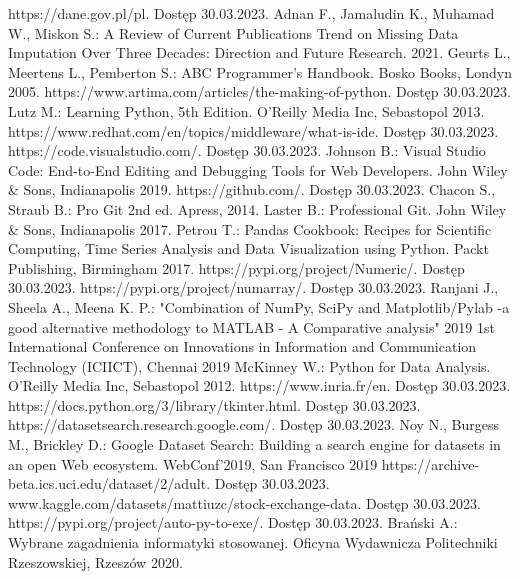 \documentclass[12pt,twoside]{article}
\begin{document}
\begin{thebibliography}{4}
     https://dane.gov.pl/pl. Dostęp 30.03.2023.
     Adnan F., Jamaludin K., Muhamad W., Miskon S.: A Review of Current Publications Trend on Missing Data Imputation Over Three Decades: Direction and Future Research. 2021.
     Geurts L., Meertens L., Pemberton S.: ABC Programmer's Handbook. Bosko Books, Londyn 2005.
     https://www.artima.com/articles/the-making-of-python. Dostęp 30.03.2023.
     Lutz M.: Learning Python, 5th Edition. O'Reilly Media Inc, Sebastopol 2013.
     https://www.redhat.com/en/topics/middleware/what-is-ide. Dostęp 30.03.2023.
     https://code.visualstudio.com/. Dostęp 30.03.2023.
     Johnson B.: Visual Studio Code: End-to-End Editing and Debugging Tools for Web Developers. John Wiley \& Sons, Indianapolis 2019.
     https://github.com/. Dostęp 30.03.2023.
     Chacon S., Straub B.: Pro Git 2nd ed. Apress, 2014.
     Laster B.: Professional Git. John Wiley \& Sons, Indianapolis 2017.
     Petrou T.: Pandas Cookbook: Recipes for Scientific Computing, Time Series Analysis and Data Visualization using Python. Packt Publishing, Birmingham 2017.
     https://pypi.org/project/Numeric/. Dostęp 30.03.2023.
     https://pypi.org/project/numarray/. Dostęp 30.03.2023.
     Ranjani J., Sheela A., Meena K. P.: "Combination of NumPy, SciPy and Matplotlib/Pylab -a good alternative methodology to MATLAB - A Comparative analysis" 2019 1st International Conference on Innovations in Information and Communication Technology (ICIICT), Chennai 2019
     McKinney W.: Python for Data Analysis. O'Reilly Media Inc, Sebastopol 2012.
     https://www.inria.fr/en. Dostęp 30.03.2023.
     https://docs.python.org/3/library/tkinter.html. Dostęp 30.03.2023.
     https://datasetsearch.research.google.com/. Dostęp 30.03.2023.
     Noy N., Burgess M., Brickley D.: Google Dataset Search: Building a search engine for datasets in an open Web ecosystem. WebConf'2019, San Francisco 2019
     https://archive-beta.ics.uci.edu/dataset/2/adult. Dostęp 30.03.2023.
     www.kaggle.com/datasets/mattiuzc/stock-exchange-data. Dostęp 30.03.2023.
     https://pypi.org/project/auto-py-to-exe/. Dostęp 30.03.2023.
     Brański A.: Wybrane zagadnienia informatyki stosowanej. Oficyna Wydawnicza Politechniki Rzeszowskiej, Rzeszów 2020.
\end{thebibliography}

\clearpage


\makesummary
\end{document}
